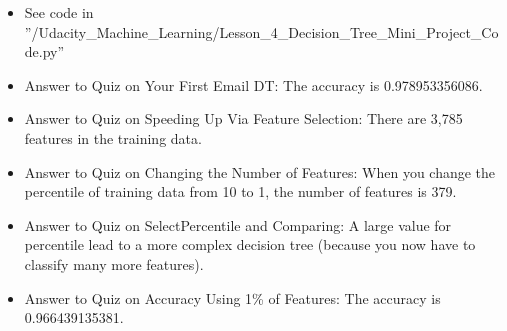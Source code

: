 \documentclass[12pt]{report}
\begin{document}
\begin{itemize}

\item See code in ''/Udacity\_Machine\_Learning/Lesson\_4\_Decision\_Tree\_Mini\_Project\_Code.py''

\item Answer to Quiz on Your First Email DT: The accuracy is 0.978953356086. 

\item Answer to Quiz on Speeding Up Via Feature Selection: There are 3,785 features in the training data. 

\item Answer to Quiz on Changing the Number of Features: When you change the percentile of training data from 10 to 1, the number of features is 379. 

\item Answer to Quiz on SelectPercentile and Comparing:  A large value for percentile lead to a more complex decision tree (because you now have to classify many more features). 

\item Answer to Quiz on Accuracy Using 1\% of Features: The accuracy is 0.966439135381. 

\end{itemize}
\end{document}
